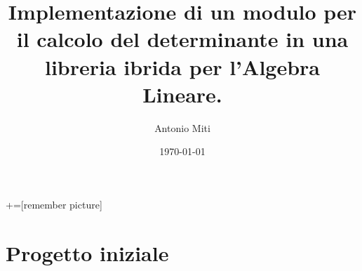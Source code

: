 \documentclass{beamer} %
\begin{document}
\title{Implementazione di un modulo per il calcolo del determinante in una libreria ibrida per l'Algebra Lineare.} 
\author{Antonio Miti} 
\date{\today} 
\frame{\titlepage} 

+=[remember picture]

\everymath{\displaystyle}



\section{Progetto iniziale} 
\end{document}
